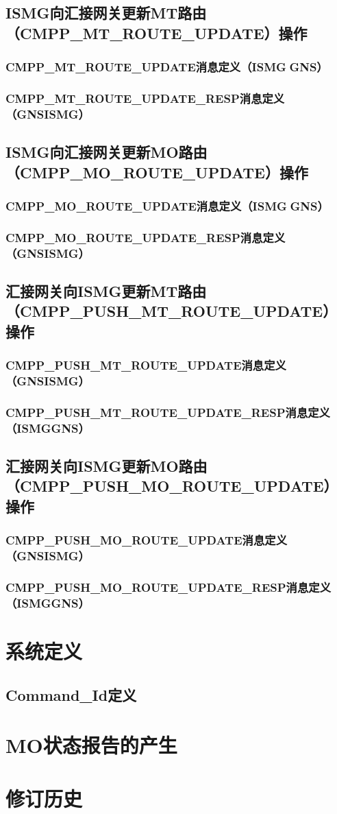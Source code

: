 \documentclass[11pt]{book} %
\begin{document}
\subsection{ISMG向汇接网关更新MT路由（CMPP\_MT\_ROUTE\_UPDATE）操作}
\subsubsection{CMPP\_MT\_ROUTE\_UPDATE消息定义（ISMGGNS）}
\subsubsection{CMPP\_MT\_ROUTE\_UPDATE\_RESP消息定义（GNS\textrightarrow ISMG）}
\subsection{ISMG向汇接网关更新MO路由（CMPP\_MO\_ROUTE\_UPDATE）操作}
\subsubsection{CMPP\_MO\_ROUTE\_UPDATE消息定义（ISMGGNS）}
\subsubsection{CMPP\_MO\_ROUTE\_UPDATE\_RESP消息定义（GNS\textrightarrow ISMG）}
\subsection{汇接网关向ISMG更新MT路由（CMPP\_PUSH\_MT\_ROUTE\_UPDATE）操作}
\subsubsection{CMPP\_PUSH\_MT\_ROUTE\_UPDATE消息定义（GNS\textrightarrow ISMG）}
\subsubsection{CMPP\_PUSH\_MT\_ROUTE\_UPDATE\_RESP消息定义（ISMG\textrightarrow GNS）}
\subsection{汇接网关向ISMG更新MO路由（CMPP\_PUSH\_MO\_ROUTE\_UPDATE）操作}
\subsubsection{CMPP\_PUSH\_MO\_ROUTE\_UPDATE消息定义（GNS\textrightarrow ISMG）}
\subsubsection{CMPP\_PUSH\_MO\_ROUTE\_UPDATE\_RESP消息定义（ISMG\textrightarrow GNS）}
\section{系统定义}
\subsection{Command\_Id定义}
\section{MO状态报告的产生}
\section{修订历史}
\end{document}
